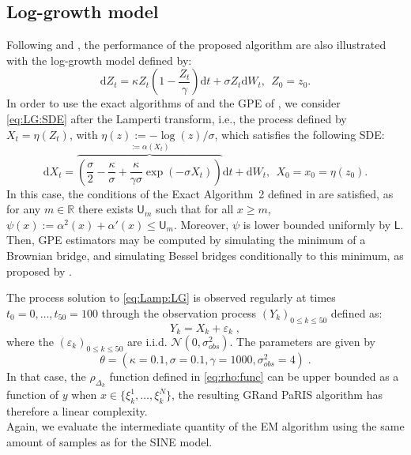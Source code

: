 \documentclass[12pt]{article}
\newcommand{\rmd}{\mathrm{d}}
\newcommand{\eqsp}{\;}
\newcommand{\1}{\mathrm{1}}
\begin{document}
\subsection*{Log-growth model}
Following \cite{beskos:papaspiliopoulos:roberts:fearnhead:2006} and \cite{olsson:westerborn:2016}, the performance of the proposed algorithm are also illustrated with the log-growth model defined by:
\begin{equation}
\rmd Z_t = \kappa Z_t\left(1-\frac{Z_t}{\gamma}\right)\rmd t + \sigma Z_t \rmd W_t,~~Z_0=z_0. \label{eq:LG:SDE}
\end{equation}
In order to use the exact algorithms of \cite{beskos:papaspiliopoulos:roberts:fearnhead:2006} and the GPE of \cite{fearnhead:papaspiliopoulos:roberts:2008}, we consider  \eqref{eq:LG:SDE} after the Lamperti transform, i.e., the process defined by $X_t=\eta(Z_t)$, with $\eta(z) := -\log (z)/\sigma$,  which satisfies the following SDE:
\begin{equation}
\rmd X_t = \overbrace{\left( \frac{\sigma}{2} -  \frac{\kappa}{\sigma} + \frac{\kappa}{\gamma\sigma}\exp\left(-\sigma X_t\right)\right)}^{:=\alpha(X_t)}\rmd t +\rmd W_t,~~X_0=x_0=\eta(z_0).\label{eq:Lamp:LG}
\end{equation}
In this case, the conditions of the Exact Algorithm~2 defined in \cite{beskos:papaspiliopoulos:roberts:fearnhead:2006} are satisfied, as for any $m \in \mathbb{R}$ there exists $\mathsf{U}_m$ such that for all $x\ge m$, $\psi(x):=\alpha^2(x)+\alpha'(x) \leq \mathsf{U}_m$. Moreover, $\psi$ is lower bounded uniformly by  $\mathsf{L}$.  Then, GPE estimators may be computed by simulating the minimum of a Brownian bridge, and simulating Bessel bridges conditionally to this minimum, as proposed by \cite{beskos:papaspiliopoulos:roberts:fearnhead:2006}.

The process solution to \eqref{eq:Lamp:LG} is observed regularly at times $t_0=0,\dots,t_{50}=100$ through the observation process $(Y_k)_{0\le k\le 50}$ defined as:
\begin{equation}
Y_k = X_k + \varepsilon_k\label{eq:obs:LG}\eqsp,
\end{equation}
where the $(\varepsilon_k)_{0\le k \le 50}$ are i.i.d. $ \mathcal{N}(0,\sigma^2_{obs})$.
The parameters are given by $$\theta =(\kappa=0.1,\sigma=0.1,\gamma=1000,\sigma^2_{obs}=4)\eqsp.$$
In that case, the $\rho_{\Delta_k}$ function defined in \eqref{eq:rho:func} can be upper bounded as a function of $y$ when $x\in \{\xi_k^1,\dots, \xi_k^N\}$, the resulting GRand PaRIS algorithm has therefore a linear complexity.\\
Again, we evaluate the intermediate quantity of the EM algorithm using the same amount of samples as for the SINE model.
\end{document}
